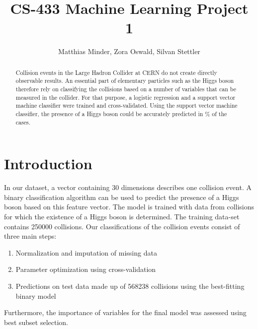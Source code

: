 \documentclass[10pt,conference,compsocconf]{IEEEtran}
\begin{document}
\title{CS-433 Machine Learning Project 1}

\author{
  Matthias Minder, Zora Oswald, Silvan Stettler\\
  
}

\maketitle

\begin{abstract}
Collision events in the Large Hadron Collider at CERN do not create directly observable results. An essential part of elementary particles such as the Higgs boson therefore rely on classifying the collisions based on a number of variables that can be measured in the collider. For that purpose, a logistic regression and a support vector machine classifier were trained and cross-validated. Using the support vector machine classifier, the presence of a Higgs boson could be accurately predicted in \% of the cases.  
\end{abstract}

\section*{Introduction} 
In our dataset, a vector containing 30 dimensions describes one collision event. A binary classification algorithm can be used to predict the presence of a Higgs boson based on this feature vector. The model is trained with data from collisions for which the existence of a Higgs boson is determined. The training data-set contains 250000 collisions.
Our classifications of the collision events consist of three main steps:
\begin{enumerate}
\item Normalization and imputation of missing data 
\item Parameter optimization using cross-validation
\item Predictions on test data made up of 568238 collisions using the best-fitting binary model 
\end{enumerate}
Furthermore, the importance of variables for the final model was assessed using best subset selection.
\end{document}
